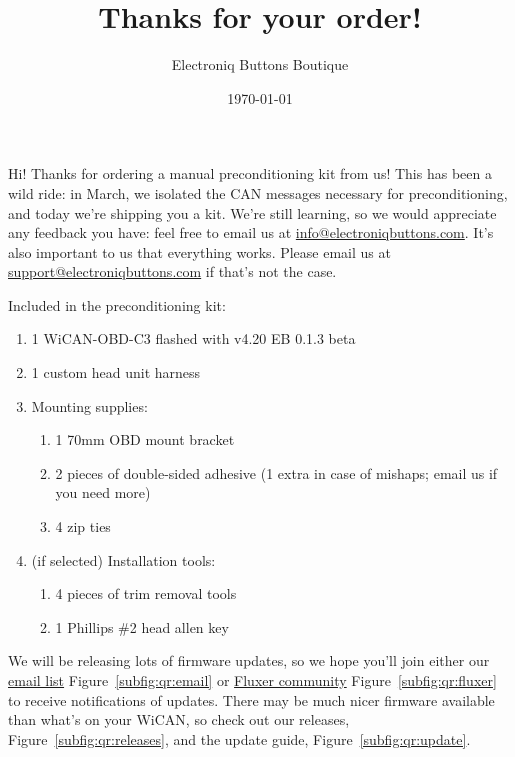 \documentclass[superscriptaddress,onecolumn,floatfix]{revtex4-2}
\begin{document}
                            
\title{Thanks for your order!}
\author{Electroniq Buttons Boutique}
\date{\today}

\maketitle

Hi! Thanks for ordering a manual preconditioning kit from us! This has been a wild ride: in March, we isolated the CAN messages necessary for preconditioning, and today we're shipping you a kit. We're still learning, so we would appreciate any feedback you have: feel free to email us at \href{mailto:info@electroniqbuttons.com}{info@electroniqbuttons.com}. It's also important to us that everything works. Please email us at \href{mailto:support@electroniqbuttons.com}{support@electroniqbuttons.com} if that's not the case. 

Included in the preconditioning kit:
{\small
\begin{enumerate}
  \item 1 WiCAN-OBD-C3 flashed with v4.20 EB 0.1.3 beta
  \item 1 custom head unit harness
  \item Mounting supplies: 
    \begin{enumerate}
      \item 1 70mm OBD mount bracket
      \item 2 pieces of double-sided adhesive (1 extra in case of mishaps; email us if you need more)
      \item 4 zip ties
    \end{enumerate}
  \item (if selected) Installation tools:
    \begin{enumerate}
      \item 4 pieces of trim removal tools
      \item 1 Phillips \#2 head allen key
    \end{enumerate}
\end{enumerate}
}

We will be releasing lots of firmware updates, so we hope you'll join either our \href{https://docs.google.com/forms/d/e/1FAIpQLSd8GtjELMu9Nn59Qep1Qt1Ey02MGxPplVcpOBm7KX2CQ7S9JQ/viewform?usp=sharing&ouid=113251294956098361139}{email list} Figure~\ref{subfig:qr:email} or \href{https://fluxer.gg/8FV7gPtN}{Fluxer community} Figure~\ref{subfig:qr:fluxer} to receive notifications of updates. There may be much nicer firmware available than what's on your WiCAN, so check out our releases, Figure~\ref{subfig:qr:releases}, and the update guide, Figure~\ref{subfig:qr:update}.
\end{document}
